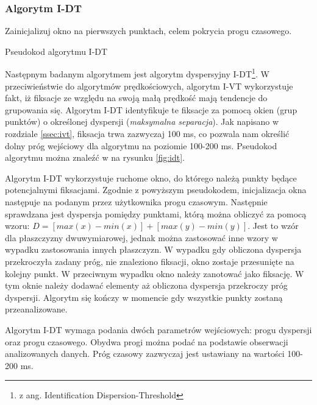 \subsubsection{Algorytm I-DT}
\label{ssec:idt}
{
\begin{algorithm}[H]

    {
        Zainicjalizuj okno na pierwszych punktach, celem pokrycia progu czasowego.\;
    }
    \;
    \caption{Pseudokod algorytmu I-DT}
    \label{fig:idt}
\end{algorithm}}
Następnym badanym algorytmem jest algorytm dyspersyjny I-DT\footnote{z ang. Identification Dispersion-Threshold}. W przeciwieństwie do algorytmów prędkościowych, algorytm I-VT wykorzystuje fakt, iż fiksacje ze względu na swoją małą prędkość mają tendencje do grupowania się. Algorytm I-DT identyfikuje te fiksacje za pomocą okien (grup punktów) o określonej dyspersji (\emph{maksymalna separacja}). Jak napisano w rozdziale \ref{ssec:ivt}, fiksacja trwa zazwyczaj 100 ms, co pozwala nam określić dolny próg wejściowy dla algorytmu na poziomie 100-200 ms. Pseudokod algorytmu można znaleźć w na rysunku \ref{fig:idt}.\par
Algorytm I-DT wykorzystuje ruchome okno, do którego należą punkty będące potencjalnymi fiksacjami. Zgodnie z powyższym pseudokodem, inicjalizacja okna następuje na podanym przez użytkownika progu czasowym. Następnie sprawdzana jest dyspersja pomiędzy punktami, którą można obliczyć za pomocą wzoru: $D = [max(x) - min(x)] + [max(y) - min(y)]$. Jest to wzór dla płaszczyzny dwuwymiarowej, jednak można zastosować inne wzory w wypadku zastosowania innych płaszczyzn. W wypadku gdy obliczona dyspersja przekroczyła zadany próg, nie znaleziono fiksacji, okno zostaje przesunięte na kolejny punkt. W przeciwnym wypadku okno należy zanotować jako fiksację. W tym oknie należy dodawać elementy aż obliczona dyspersja przekroczy próg dyspersji. Algorytm się kończy w momencie gdy wszystkie punkty zostaną przeanalizowane.\par
Algorytm I-DT wymaga podania dwóch parametrów wejściowych: progu dyspersji oraz progu czasowego. Obydwa progi można podać na podstawie obserwacji analizowanych danych. Próg czasowy zazwyczaj jest ustawiany na wartości 100-200 ms.
